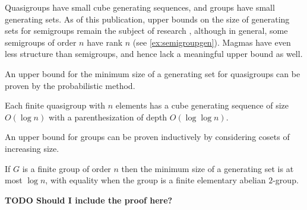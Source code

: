 \documentclass{article}
\newcommand{\todo}[1]{\textbf{TODO #1}}
\newcommand{\gen}[1]{\langle #1 \rangle}
\begin{document}
Quasigroups have small cube generating sequences, and groups have small generating sets.
As of this publication, upper bounds on the size of generating sets for semigroups remain the subject of research \autocite{gray14}, although in general, some semigroups of order $n$ have rank $n$ (see \autoref{ex:semigroupgen}).
Magmas have even less structure than semigroups, and hence lack a meaningful upper bound as well.

An upper bound for the minimum size of a generating set for quasigroups can be proven by the probabilistic method.

\begin{lemma}\label{lem:small}
  Each finite quasigroup with $n$ elements has a cube generating sequence of size $O(\log n)$ with a parenthesization of depth $O(\log \log n)$.
\end{lemma}

An upper bound for groups can be proven inductively by considering cosets of increasing size.

\begin{lemma}\label{lem:log}
  If $G$ is a finite group of order $n$ then the minimum size of a generating set is at most $\log n$, with equality when the group is a finite elementary abelian $2$-group.
\end{lemma}
\todo{Should I include the proof here?}

\end{document}
